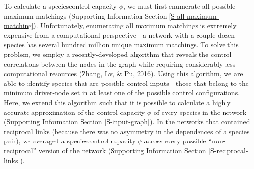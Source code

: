 \documentclass[a4paper]{artikel1}
\theoremstyle{definition}
\theoremstyle{definition}
\theoremstyle{definition}
\theoremstyle{remark}
\providecommand{\DIFaddtex}[1]{{\protect\color{blue}\uwave{#1}}} %
\providecommand{\DIFaddbegin}{} %
\providecommand{\DIFaddend}{} %
\providecommand{\DIFadd}[1]{\texorpdfstring{\DIFaddtex{#1}}{#1}} %
\begin{document}
To calculate a species\DIFaddbegin \DIFadd{' }\DIFaddend control capacity \(\phi\), we must first
enumerate all possible maximum matchings (Supporting Information Section
\ref{S-all-maximum-matching}). Unfortunately, enumerating all maximum
matchings is extremely expensive from a computational perspective---a
network with a couple dozen species has several hundred million unique
maximum matchings. To solve this problem, we employ a recently-developed
algorithm that reveals the control correlations between the nodes in the
graph while requiring considerably less computational resources (Zhang,
Lv, \& Pu, 2016). Using this algorithm, we are able to identify species
that are possible control inputs---those that belong to the minimum
driver-node set in at least one of the possible control configurations.
Here, we extend this algorithm such that it is possible to calculate a
highly accurate approximation of the control capacity \(\phi\) of every
species in the network (Supporting Information Section
\ref{S-input-graph}). In the networks that contained reciprocal links
(because there was no asymmetry in the dependences of a species pair),
we averaged a species\DIFaddbegin \DIFadd{' }\DIFaddend control capacity \(\phi\) across every possible
``non-reciprocal'' version of the network (Supporting Information
Section \ref{S-reciprocal-links}).
\end{document}
